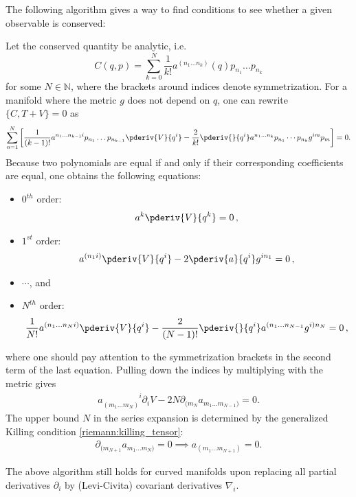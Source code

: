     The following algorithm gives a way to find conditions to see whether a given observable is conserved:
    \begin{method}
        Let the conserved quantity be analytic, i.e.~\[C(q,p) = \sum_{k=0}^N\frac{1}{k!}a^{(n_1\ldots n_k)}(q)p_{n_1}\ldots p_{n_k}\] for some $N\in\mathbb{N}$, where the brackets around indices denote symmetrization. For a manifold where the metric $g$ does not depend on $q$, one can rewrite $\{C,T+V\} = 0$ as \[\sum_{n=1}^N\left[\frac{1}{(k-1)!}a^{n_1\ldots n_{k-1}i}p_{n_1}\ldots p_{n_{k-1}}\pderiv{V}{q^i} - \frac{2}{k!}\pderiv{}{q^i}a^{n_1\ldots n_k}p_{n_1}\cdots p_{n_k}g^{im}p_m\right] = 0.\] Because two polynomials are equal if and only if their corresponding coefficients are equal, one obtains the following equations:
        \begin{itemize}
            \item $0^{th}$ order:
                \begin{gather}
                    a^k\pderiv{V}{q^k} = 0\,,
                \end{gather}
            \item $1^{st}$ order:
                \begin{gather}
                    a^{(n_1i)}\pderiv{V}{q^i} - 2\pderiv{a}{q^i}g^{in_1} = 0\,,
                \end{gather}
            \item $\cdots$, and
            \item $N^{th}$ order:
                \begin{gather}
                    \frac{1}{N!}a^{(n_1\ldots n_Ni)}\pderiv{V}{q^i} - \frac{2}{(N-1)!}\pderiv{}{q^i}a^{(n_1\ldots n_{N-1}}g^{i)n_N} = 0\,,
                \end{gather}
        \end{itemize}
        where one should pay attention to the symmetrization brackets in the second term of the last equation. Pulling down the indices by multiplying with the metric gives
        \begin{gather}
            a_{(m_1\ldots m_N)}^{\phantom{(m_1\ldots m_N)}i}\partial_iV - 2N\partial_{(m_N}a_{m_1\ldots m_{N-1})} = 0.
        \end{gather}
        The upper bound $N$ in the series expansion is determined by the generalized Killing condition \eqref{riemann:killing_tensor}:
        \begin{gather}
            \partial_{(m_{N+1}}a_{m_1\ldots m_N)} = 0\implies a_{(m_1\ldots m_{N+1})} = 0.
        \end{gather}
    \end{method}
    \begin{remark}
        The above algorithm still holds for curved manifolds upon replacing all partial derivatives $\partial_i$ by (Levi-Civita) covariant derivatives $\nabla_i$.
    \end{remark}

